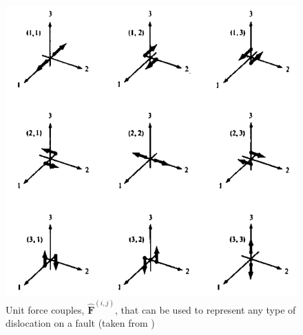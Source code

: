 \documentclass[12pt]{article}
\begin{document}
\begin{figure}[h!]
\includegraphics[scale=0.4]{figures/MomentTensor}
\centering
\caption{Unit force couples, $\boldsymbol{\hat{F}}^{(i,j)}$, that can
  be used to represent any type of dislocation on a fault (taken from
  \citet{AR2002})}

\end{figure}
\end{document}
